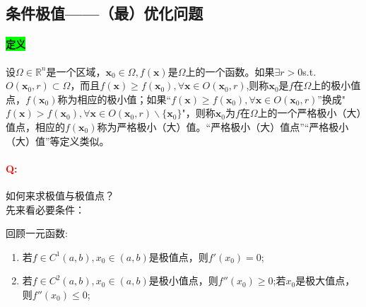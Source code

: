 \documentclass[UTF8]{ctexart}
\begin{document}
    \subsection{条件极值——（最）优化问题}
    \paragraph{\colorbox{lime}{定义}}设$\Omega\in\mathbb{R}^n$是一个区域，$\boldsymbol{x}_0\in\Omega,f(\boldsymbol{x})$是$\Omega$上的一个函数。如果$\exists r>0$s.t.$O(\boldsymbol{x}_0,r)\subset\Omega$，而且$f(\boldsymbol{x})\ge f(\boldsymbol{x}_0),\forall\boldsymbol{x}\in O(\boldsymbol{x}_0,r)$,则称$\boldsymbol{x}_0$是$f$在$\Omega$上的极小值点，$f(\boldsymbol{x}_0)$称为相应的极小值；如果“$f(\boldsymbol{x})\ge f(\boldsymbol{x}_0),\forall\boldsymbol{x}\in O(\boldsymbol{x}_0,r)$”换成"$f(\boldsymbol{x})> f(\boldsymbol{x}_0),\forall\boldsymbol{x}\in O(\boldsymbol{x}_0,r)\backslash\{\boldsymbol{x}_0\}$"，则称$\boldsymbol{x}_0$为$f$在$\Omega$上的一个严格极小（大）值点，相应的$f(\boldsymbol{x}_0)$称为严格极小（大）值。“严格极小（大）值点”“严格极小（大）值”等定义类似。

    \paragraph{\textcolor{red}{Q:}}如何来求极值与极值点？\\
    先来看必要条件：

    回顾一元函数:\begin{enumerate}
        \item 若$f\in C^1(a,b),x_0\in(a,b)$是极值点，则$f'(x_0)=0$;
        \item 若$f\in C^2(a,b),x_0\in(a,b)$是极小值点，则$f''(x_0)\ge 0$;若$x_0$是极大值点，则$f''(x_0)\le 0$;
    \end{enumerate}
\end{document}
